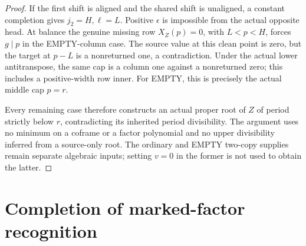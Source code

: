 \documentclass[11pt,a4paper]{amsart}
\numberwithin{equation}{section}
\theoremstyle{plain}
\theoremstyle{definition}
\begin{document}
\begin{proof}
If the first shift is aligned and the shared shift is unaligned, a
constant completion gives \(j_2=H,\ell=L\).  Positive \(\epsilon\)
is impossible from the actual opposite head.  At balance the genuine
missing row \(X_Z(p)=0\), with \(L<p<H\), forces \(g\mid p\) in
the EMPTY-column case.  The source value at this clean point is zero,
but the target at \(p-L\) is a nonreturned one, a contradiction.
Under the actual lower antitranspose, the same cap is a column one
against a nonreturned zero; this includes a positive-width row inner.
For EMPTY, this is precisely the actual middle cap \(p=r\).

Every remaining case therefore constructs an actual proper root of
\(Z\) of period strictly below \(r\), contradicting its inherited
period divisibility.  The argument uses no minimum on a coframe or a
factor polynomial and no upper divisibility inferred from a source-only
root.  The ordinary and EMPTY two-copy supplies remain separate algebraic
inputs; setting \(v=0\) in the former is not used to obtain the latter.
\end{proof}
\section{Completion of marked-factor recognition}\label{sec:completion}
\end{document}
